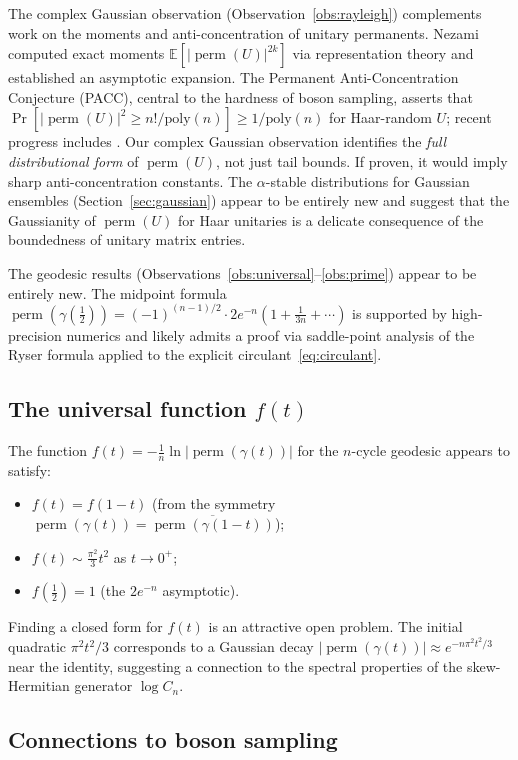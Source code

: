 \documentclass[11pt]{amsart}
\theoremstyle{definition}
\theoremstyle{remark}
\DeclareMathOperator{\perm}{perm}
\begin{document}
The complex Gaussian observation (Observation~\ref{obs:rayleigh})
complements work on the moments and anti-concentration of unitary
permanents.
Nezami~\cite{Nezami21} computed exact moments
$\mathbb{E}[|\perm(U)|^{2k}]$ via representation theory and
established an asymptotic expansion.
The Permanent Anti-Concentration Conjecture (PACC), central to the
hardness of boson sampling, asserts that
$\Pr[|\perm(U)|^2\ge n!/\mathrm{poly}(n)]\ge 1/\mathrm{poly}(n)$
for Haar-random $U$; recent progress includes
\cite{FeffermanGhoshZhan24,KwanSahSawhney24}.
Our complex Gaussian observation identifies the \emph{full
distributional form} of $\perm(U)$, not just tail bounds.  If proven,
it would imply sharp anti-concentration constants.  The $\alpha$-stable
distributions for Gaussian ensembles (Section~\ref{sec:gaussian})
appear to be entirely new and suggest that the Gaussianity of
$\perm(U)$ for Haar unitaries is a delicate consequence of the
boundedness of unitary matrix entries.

The geodesic results (Observations~\ref{obs:universal}--\ref{obs:prime})
appear to be entirely new.  The midpoint formula
$\perm(\gamma(\frac12))=(-1)^{(n-1)/2}\cdot 2e^{-n}(1+\frac{1}{3n}+\cdots)$
is supported by high-precision numerics and likely admits a proof via
saddle-point analysis of the Ryser formula applied to the explicit
circulant~\eqref{eq:circulant}.

\subsection{The universal function $f(t)$}

The function $f(t)=-\frac{1}{n}\ln|\perm(\gamma(t))|$ for the
$n$-cycle geodesic appears to satisfy:
\begin{itemize}
\item $f(t)=f(1-t)$ (from the symmetry $\perm(\gamma(t))=\overline{\perm(\gamma(1-t))}$);
\item $f(t)\sim \frac{\pi^2}{3}t^2$ as $t\to 0^+$;
\item $f(\frac12)=1$ (the $2e^{-n}$ asymptotic).
\end{itemize}
Finding a closed form for $f(t)$ is an attractive open problem.
The initial quadratic $\pi^2 t^2/3$ corresponds to a Gaussian decay
$|\perm(\gamma(t))|\approx e^{-n\pi^2 t^2/3}$ near the identity,
suggesting a connection to the spectral properties of the
skew-Hermitian generator $\log C_n$.

\subsection{Connections to boson sampling}\label{sec:boson}
\end{document}
